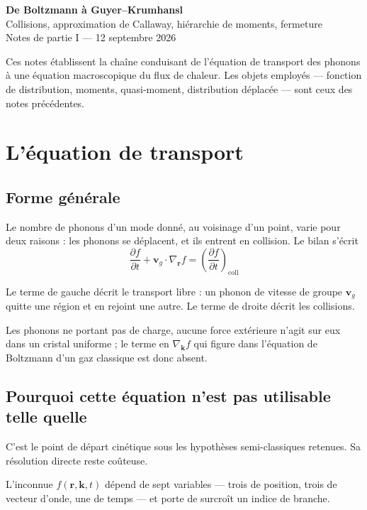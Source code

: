 \documentclass[11pt,a4paper]{article}
\begin{document}
\begin{center}
{\Large\bfseries De Boltzmann à Guyer--Krumhansl}\\[4pt]
{\normalsize Collisions, approximation de Callaway, hiérarchie de moments, fermeture}\\[2pt]
{\small Notes de partie I --- 12 septembre 2026}
\end{center}

\vspace{4pt}


Ces notes établissent la chaîne conduisant de l'équation de transport des phonons à une équation
macroscopique du flux de chaleur. Les objets employés --- fonction de distribution, moments,
quasi-moment, distribution déplacée --- sont ceux des notes précédentes.

\section{L'équation de transport}

\subsection{Forme générale}

Le nombre de phonons d'un mode donné, au voisinage d'un point, varie pour deux raisons : les
phonons se déplacent, et ils entrent en collision. Le bilan s'écrit
\[ \boxed{\;\frac{\partial f}{\partial t} + \mathbf{v}_g \cdot \nabla_\mathbf{r} f
= \left(\frac{\partial f}{\partial t}\right)_{\!\mathrm{coll}}\;} \]

Le terme de gauche décrit le transport libre : un phonon de vitesse de groupe $\mathbf{v}_g$ quitte
une région et en rejoint une autre. Le terme de droite décrit les collisions.

Les phonons ne portant pas de charge, aucune force extérieure n'agit sur eux dans un cristal
uniforme ; le terme en $\nabla_\mathbf{k} f$ qui figure dans l'équation de Boltzmann d'un gaz
classique est donc absent.

\subsection{Pourquoi cette équation n'est pas utilisable telle quelle}

C'est le point de départ cinétique sous les hypothèses semi-classiques retenues. Sa résolution directe reste coûteuse.

L'inconnue $f(\mathbf{r}, \mathbf{k}, t)$ dépend de sept variables --- trois de position, trois de
vecteur d'onde, une de temps --- et porte de surcroît un indice de branche.
\end{document}
